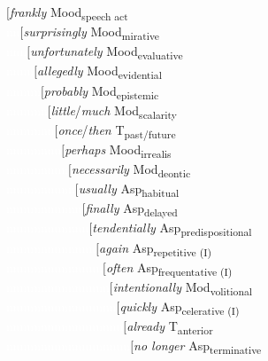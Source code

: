 \begin{exe}
\ex\label{bsp:hierarchyone} 
{\small $[$\textit{frankly} Mood\textsubscript{speech act} \\
\textcolor{white}{nn}$[$\textit{surprisingly} Mood\textsubscript{mirative} \\
\textcolor{white}{nnn}$[$\textit{unfortunately} Mood\textsubscript{evaluative} \\
\textcolor{white}{nnnn}$[$\textit{allegedly} Mood\textsubscript{evidential} \\
\textcolor{white}{nnnnn}$[$\textit{probably} Mod\textsubscript{epistemic} \\
\textcolor{white}{nnnnnn}$[$\textit{little}/\textit{much} Mod\textsubscript{scalarity} \\
\textcolor{white}{nnnnnnn}$[$\textit{once}/\textit{then} T\textsubscript{past/future} \\
\textcolor{white}{nnnnnnnn}$[$\textit{perhaps} Mood\textsubscript{irrealis} \\
\textcolor{white}{nnnnnnnnn}$[$\textit{necessarily} Mod\textsubscript{deontic} \\
\textcolor{white}{nnnnnnnnnn}$[$\textit{usually} Asp\textsubscript{habitual} \\
\textcolor{white}{nnnnnnnnnnn}$[$\textit{finally} Asp\textsubscript{delayed} \\
\textcolor{white}{nnnnnnnnnnnn}$[$\textit{tendentially} Asp\textsubscript{predispositional} \\
\textcolor{white}{nnnnnnnnnnnnn}$[$\textit{again} Asp\textsubscript{repetitive (I)} \\
\textcolor{white}{nnnnnnnnnnnnnn}$[$\textit{often} Asp\textsubscript{frequentative (I)} \\
\textcolor{white}{nnnnnnnnnnnnnnn}$[$\textit{intentionally} Mod\textsubscript{volitional} \\
\textcolor{white}{nnnnnnnnnnnnnnnn}$[$\textit{quickly} Asp\textsubscript{celerative (I)} \\
\textcolor{white}{nnnnnnnnnnnnnnnnn}$[$\textit{already} T\textsubscript{anterior} \\
\textcolor{white}{nnnnnnnnnnnnnnnnnn}$[$\textit{no longer} Asp\textsubscript{terminative} \\
}
\end{exe}
